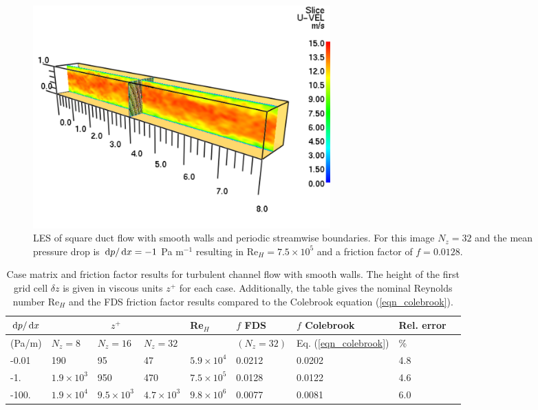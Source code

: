 \documentclass[11pt]{book}
\begin{document}
\begin{figure}
   \begin{center}
      \includegraphics[width=4.5in]{FIGURES/channel_flow_setup}
      \caption[LES of square duct flow]{\label{fig_channel_flow_setup} LES of square duct flow with smooth walls and periodic streamwise boundaries.  For this image $N_z=32$ and the mean pressure drop is $\,\mathrm{d} p/ \,\mathrm{d} x = -1$ Pa m$^{-1}$ resulting in Re$_H = 7.5\times 10^5$ and a friction factor of $f=0.0128$.}
   \end{center}
\end{figure}

\begin{table}
\begin{center}
\caption[Case matrix for Moody chart]{\label{tab_zplus} Case matrix and friction factor results for turbulent channel flow with smooth walls.
The height of the first grid cell $\delta z$ is given in viscous units $z^+$ for each case.  Additionally, the table gives the nominal Reynolds number Re$_H$ and the FDS friction factor results compared to the Colebrook equation (\ref{eqn_colebrook}).}
\vspace{0.5cm}
\begin{tabular}{|*{9}{l|}}
\hline
$\,\mathrm{d} p/\,\mathrm{d} x$   & \multicolumn{3}{c|}{$z^+$} &  Re$_H$  & $f$ FDS  & $f$ Colebrook & Rel. error \\
\hline (Pa/m)           & $N_z=8$          & $N_z=16$          & $N_z=32$          &                   & $(N_z=32)$ & Eq. (\ref{eqn_colebrook}) & \% \\
\hline\hline -0.01      & 190              & 95                & 47                & $5.9\times 10^4$  & 0.0212     & 0.0202   & 4.8                 \\
\hline -1.    & $1.9\times 10^3$ & 950               & 470               & $7.5\times 10^5$  & 0.0128     & 0.0122   & 4.6                 \\
\hline -100.  & $1.9\times 10^4$ & $9.5\times 10^3$  & $4.7\times 10^3$  & $9.8\times 10^6$  & 0.0077     & 0.0081   & 6.0                 \\
\hline
\end{tabular}
\end{center}
\end{table}
\end{document}

